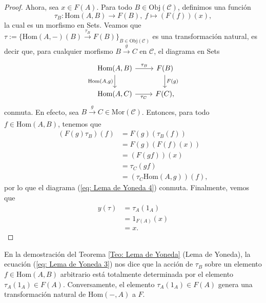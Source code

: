 \documentclass[tesis]{subfiles}
\begin{document}
\begin{proof}
    Ahora, sea $x\in F(A)$. Para todo $B\in\text{Obj}(\mathscr{C})$, definimos una función
    \[
        \tau_B:\text{Hom}(A,B)\to F(B), \ f \mapsto (F(f))(x),
    \]
    la cual es un morfismo en Sets. Veamos que $\tau := \{\text{Hom}(A,-)(B)\xrightarrow[]{\tau_B} F(B)\}_{B\in\text{Obj}(\mathscr{C})}$ es una transformación natural, es decir que, para cualquier morfismo $B\xrightarrow[]{g}C$ en $\mathscr{C}$, el diagrama en Sets
    \begin{equation}\label{eq: Lema de Yoneda 4}
        \begin{tikzcd}
            \text{Hom}(A,B) \arrow[]{d}[swap]{\text{Hom}(A,g)} \arrow[]{r}[]{\tau_B} &F(B) \arrow[]{d}[]{F(g)} \\
            \text{Hom}(A,C) \arrow[]{r}[swap]{\tau_C} &F(C),
        \end{tikzcd}
    \end{equation}
    conmuta. En efecto, sea $B\xrightarrow[]{g} C\in\text{Mor}(\mathscr{C})$. Entonces, para todo $f\in\text{Hom}(A,B)$, tenemos que
    \begin{align*}
        (F(g)\tau_B)(f) &= F(g)(\tau_B(f)) \\
                        &= F(g)(F(f)(x))  \\
                        &= (F(gf))(x)  \\
                        &= \tau_C(gf) \\
                        &= (\tau_C\text{Hom}(A,g))(f),
    \end{align*}
    por lo que el diagrama (\ref{eq: Lema de Yoneda 4}) conmuta. Finalmente, vemos que
    \begin{align*}
        y(\tau) &= \tau_A(1_A) \\
                &= 1_{F(A)}(x) \\
                &= x.
    \end{align*}
\end{proof}

\begin{Obs}\label{Obs: Lema de Yoneda}
    En la demostración del Teorema \ref{Teo: Lema de Yoneda} (Lema de Yoneda), la ecuación (\ref{eq: Lema de Yoneda 3}) nos dice que la acción de $\tau_B$ sobre un elemento $f\in\text{Hom}(A,B)$ arbitrario está totalmente determinada por el elemento $\tau_A(1_A)\in F(A)$. Conversamente, el elemento $\tau_A(1_A)\in F(A)$ genera una transformación natural de $\text{Hom}(-,A)$ a $F$.
\end{Obs}
\end{document}

